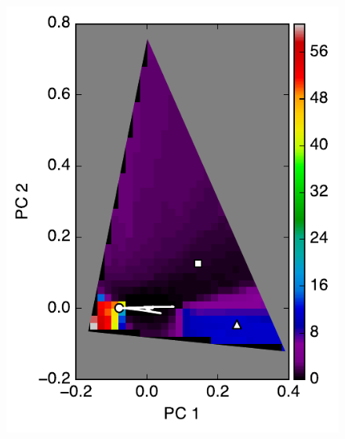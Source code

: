 \documentclass[iop,numberedappendix,apj]{emulateapj}
\begin{document}
\begin{figure}[tbh!]
   \begin{minipage}{0.33\hsize}
    \begin{center}
\includegraphics[width=\hsize]{mockdata_90deg_3types_t12_lc_noreg.pdf}
    \end{center}
     \end{minipage}   
    \begin{minipage}{0.33\hsize}
    \begin{center}

\end{center}
\end{minipage}
\end{figure}
\end{document}
